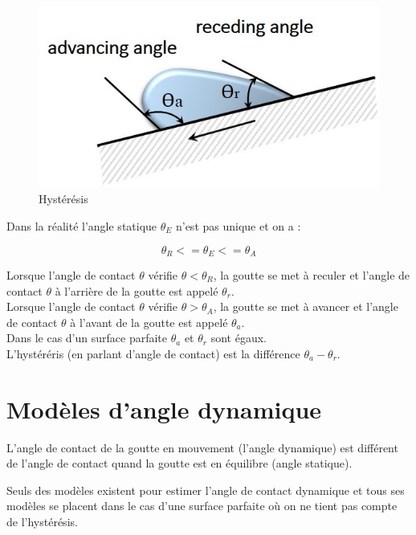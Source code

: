 \begin{figure}[ht]
	\label{fig:hysteresis}
	\centering
	\includegraphics[scale = 0.8]{./gfx/hysteresis.jpg}
	\caption{Hystérésis}
\end{figure}
Dans la réalité l'angle statique $\theta_{E}$ n'est pas unique et on a :

\begin{equation}
	\theta_{R} <= \theta_{E} <= \theta_{A}
\end{equation}

Lorsque l'angle de contact $\theta$ vérifie $\theta < \theta_{R}$, la goutte se met à reculer et l'angle de contact $\theta$ à l'arrière de la goutte est appelé $\theta_{r}$.\\

Lorsque l'angle de contact $\theta$ vérifie $\theta > \theta_{A}$, la goutte se met à avancer et l'angle de contact $\theta$ à l'avant de la goutte est appelé $\theta_{a}$.\\

Dans le cas d'un surface parfaite $\theta_{a}$ et $\theta_{r}$ sont égaux.\\

L'hystéréris (en parlant d'angle de contact) est la différence $\theta_{a}-\theta_{r}$.

\section{Modèles d'angle dynamique}

L'angle de contact de la goutte en mouvement (l'angle dynamique) est différent de l'angle de contact quand la goutte est en équilibre (angle statique).

Seuls des modèles existent pour estimer l'angle de contact dynamique et tous ses modèles se placent dans le cas d'une surface parfaite où on ne tient pas compte de l'hystérésis. 

